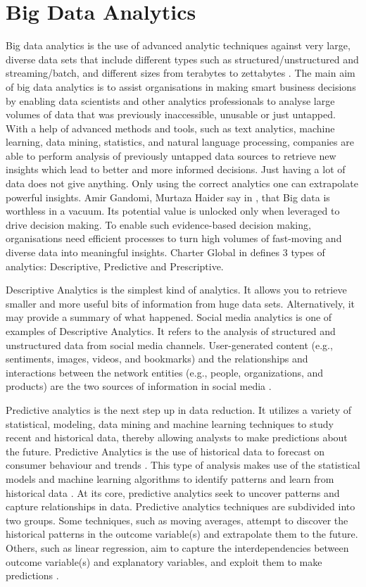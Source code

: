 \documentclass[runningheads]{llncs}
\begin{document}
\section{Big Data Analytics}
Big data analytics is the use of advanced analytic techniques against very large, diverse data sets that include different types such as structured/unstructured and streaming/batch, and different sizes from terabytes to zettabytes \cite{IBM}. The main aim of big data analytics is to assist organisations in making smart business decisions by enabling data scientists and other analytics professionals to analyse large volumes of data that  was previously inaccessible, unusable or just untapped.  With a help of advanced methods and tools, such as text analytics, machine learning, data mining, statistics, and natural language processing, companies are able to perform analysis of previously untapped data sources to retrieve new insights which lead to better and more informed decisions. Just having a lot of data does not give anything. Only using the correct analytics one can extrapolate powerful insights. Amir Gandomi, Murtaza Haider say in \cite{ELS}, that Big data is worthless in a vacuum. Its potential value is unlocked only when leveraged to drive decision making. To enable such evidence-based decision making, organisations need efficient processes to turn high volumes of fast-moving and diverse data into meaningful insights. Charter Global in \cite{CHARTER} defines 3 types of analytics: Descriptive, Predictive and Prescriptive. 

Descriptive Analytics is the simplest kind of analytics. It allows you to retrieve smaller and more useful bits of information from huge data sets. Alternatively, it may provide a summary of what happened. Social media analytics is one of examples of Descriptive Analytics. It refers to the analysis of structured and unstructured data from social media channels. User-generated content (e.g., sentiments, images, videos, and bookmarks) and the relationships and interactions between the network entities (e.g., people, organizations, and products) are the two sources of information in social media \cite{ELS}. 

Predictive analytics is the next step up in data reduction. It utilizes a variety of statistical, modeling, data mining and machine learning techniques to study recent and historical data, thereby allowing analysts to make predictions about the future\cite{CHARTER}. Predictive Analytics is the use of historical data to forecast on consumer behaviour and trends \cite{TALLIN}. This type of analysis makes use of the statistical models and machine learning algorithms to identify patterns and learn from historical data \cite{MIS}. At its core, predictive analytics seek to uncover patterns and capture relationships in data. Predictive analytics techniques are subdivided into two groups. Some techniques, such as moving averages, attempt to discover the historical patterns in the outcome variable(s) and extrapolate them to the future. Others, such as linear regression, aim to capture the interdependencies between outcome variable(s) and explanatory variables, and exploit them to make predictions \cite{ELS}.
\end{document}
